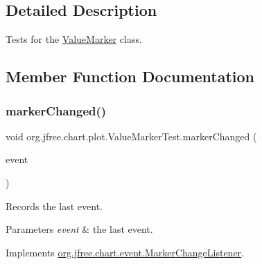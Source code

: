 \subsection{Detailed Description}
Tests for the \mbox{\hyperlink{classorg_1_1jfree_1_1chart_1_1plot_1_1_value_marker}{Value\+Marker}} class. 

\subsection{Member Function Documentation}
\mbox{\label{classorg_1_1jfree_1_1chart_1_1plot_1_1_value_marker_test_a3fa1fe77ea5a55945955a0bb31672627}} 
\subsubsection{\texorpdfstring{marker\+Changed()}{markerChanged()}}
{\footnotesize\ttfamily void org.\+jfree.\+chart.\+plot.\+Value\+Marker\+Test.\+marker\+Changed (\begin{DoxyParamCaption}\item[{\mbox{\hyperlink{classorg_1_1jfree_1_1chart_1_1event_1_1_marker_change_event}{Marker\+Change\+Event}}}]{event }\end{DoxyParamCaption})}

Records the last event.


\begin{DoxyParams}{Parameters}
{\em event} & the last event. \\
\hline
\end{DoxyParams}


Implements \mbox{\hyperlink{interfaceorg_1_1jfree_1_1chart_1_1event_1_1_marker_change_listener_a0797552ac12ca77a9ddd96cfe5abb60e}{org.\+jfree.\+chart.\+event.\+Marker\+Change\+Listener}}.

\mbox{\label{classorg_1_1jfree_1_1chart_1_1plot_1_1_value_marker_test_a1e5f675f58875ff9f0325a81f126e447}} 
